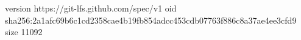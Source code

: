 version https://git-lfs.github.com/spec/v1
oid sha256:2a1afc69b6c1cd2358cae4b19fb854adcc453cdb07763f886c8a37ae4ee3cfd9
size 11092
